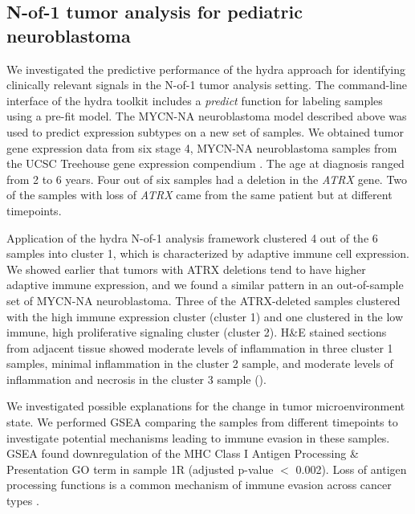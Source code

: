 \documentclass[10pt,letterpaper]{article}
\begin{document}
\subsection*{N-of-1 tumor analysis for pediatric neuroblastoma}
We investigated the predictive performance of the hydra approach for identifying clinically relevant signals in the N-of-1 tumor analysis setting. The command-line interface of the hydra toolkit includes a \textit{predict} function for labeling samples using a pre-fit model. The MYCN-NA neuroblastoma model described above was used to predict expression subtypes on a new set of samples. We obtained tumor gene expression data from six stage 4, MYCN-NA neuroblastoma samples from the UCSC Treehouse gene expression compendium \cite{newtonTumorMapExploringMolecular2017, vaskeComparativeTumorRNA2019}. The age at diagnosis ranged from 2 to 6 years. Four out of six samples had a deletion in the \textit{ATRX} gene. Two of the samples with loss of \textit{ATRX} came from the same patient but at different timepoints.

Application of the hydra N-of-1 analysis framework clustered 4 out of the 6 samples into cluster 1, which is characterized by adaptive immune cell expression. We showed earlier that tumors with ATRX deletions tend to have higher adaptive immune expression, and we found a similar pattern in an out-of-sample set of MYCN-NA neuroblastoma. Three of the ATRX-deleted samples clustered with the high immune expression cluster (cluster 1) and one clustered in the low immune, high proliferative signaling cluster (cluster 2). H\&E stained sections from adjacent tissue showed moderate levels of inflammation in three cluster 1 samples, minimal inflammation in the cluster 2 sample, and moderate levels of inflammation and necrosis in the cluster 3 sample ().

We investigated possible explanations for the change in tumor microenvironment state. We performed GSEA comparing the samples from different timepoints to investigate potential mechanisms leading to immune evasion in these samples. GSEA found downregulation of the MHC Class I Antigen Processing \& Presentation GO term in sample 1R (adjusted p-value $<$ 0.002). Loss of antigen processing functions is a common mechanism of immune evasion across cancer types \cite{reevesAntigenProcessingImmune2017}.
\end{document}
